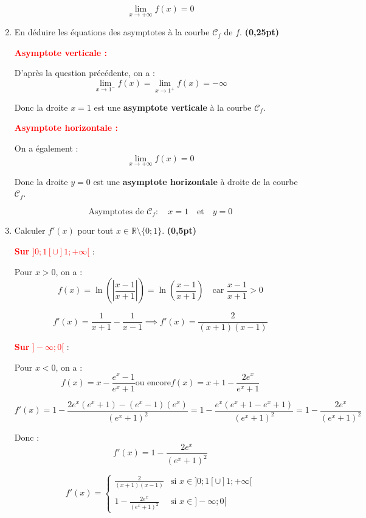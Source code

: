 \documentclass[12pt,a4paper]{article}
\begin{document}
\begin{enumerate}
\begin{resultbox}
\[
\boxed{\lim_{x \to +\infty} f(x) = 0}
\]
\end{resultbox}

\item En déduire les équations des asymptotes à la courbe \( \mathscr{C}_f \) de \( f \). \hfill \textbf{(0,25pt)}

\textcolor{red}{\textbf{Asymptote verticale :}}

D’après la question précédente, on a :
\[
\lim_{x \to 1^-} f(x) = \lim_{x \to 1^+} f(x) = -\infty
\]

Donc la droite \( x = 1 \) est une \textbf{asymptote verticale} à la courbe \( \mathscr{C}_f \).

\vspace{0.5em}
\textcolor{red}{\textbf{Asymptote horizontale :}}

On a également :
\[
\lim_{x \to +\infty} f(x) = 0
\]

Donc la droite \( y = 0 \) est une \textbf{asymptote horizontale} à droite de la courbe \( \mathscr{C}_f \).

\begin{resultbox}
\[
\boxed{
\text{Asymptotes de } \mathscr{C}_f :
\quad x = 1 \quad \text{et} \quad y = 0
}
\]
\end{resultbox}

\item Calculer \( f'(x) \) pour tout \( x \in \mathbb{R} \setminus \{0 ; 1\} \). \hfill \textbf{(0,5pt)}

\textcolor{red}{\textbf{Sur } \( ]0 ; 1[ \cup ]1 ; +\infty[ \)} :

Pour \( x > 0 \), on a :
\[
f(x) = \ln\left( \left| \frac{x - 1}{x + 1} \right| \right) = \ln\left( \frac{x - 1}{x + 1} \right) \quad \text{car } \frac{x - 1}{x + 1} > 0
\]

\[
f'(x) = \frac{1}{x+1} - \frac{1}{x-1}\implies  f'(x) =\frac{2}{(x + 1)(x - 1)}
\]

\textcolor{red}{\textbf{Sur } \( ]-\infty ; 0[ \)} :

Pour \( x < 0 \), on a :
\[
f(x) = x - \frac{e^x - 1}{e^x + 1} \text{ou encore} f(x) = x+1 - \frac{2e^x}{e^x + 1}
\]

\[
f'(x)=1 - \frac{2e^x (e^x + 1) - (e^x - 1)(e^x)}{(e^x + 1)^2}
=1- \frac{e^x(e^x + 1 - e^x + 1)}{(e^x + 1)^2}
=1- \frac{2e^x}{(e^x + 1)^2}
\]

Donc :
\[
f'(x) = 1 - \frac{2e^x}{(e^x + 1)^2}
\]

\begin{resultbox}
\[
f'(x) =
\begin{cases}
\displaystyle \frac{2}{(x + 1)(x - 1)} & \text{si } x \in ]0 ; 1[ \cup ]1 ; +\infty[ \\
\\
\displaystyle 1 - \frac{2e^x}{(e^x + 1)^2} & \text{si } x \in ]-\infty ; 0[
\end{cases}
\]
\end{resultbox}


\end{enumerate}
\end{document}
